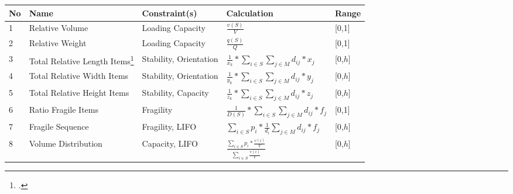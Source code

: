 \begin{table}[ht!]
    \centering
    \renewcommand{\arraystretch}{2.0}
    \begin{tabular}{@{}P{0.08\textwidth}P{0.16\textwidth}P{0.26\textwidth}P{0.28\textwidth}@{}P{0.1\textwidth}@{}}
        \toprule
        No & Name                                                                                            & Constraint(s)          & Calculation                                                               & Range   \\
          & Relative Volume                                                                                 & Loading Capacity       & $\displaystyle\frac{v(S)}{V}$                                             & [0,1]   \\
        2  & Relative Weight                                                                                 & Loading Capacity       & $\displaystyle\frac{q(S)}{Q}$                                             & [0,1]   \\
        3  & Total Relative Length Items\footcite[Feature is adapted from][p.21]{sarah_de_wolf_machine_2022} & Stability, Orientation & $\displaystyle\frac{1}{x_k} * \sum_{i \in S}\sum_{j \in M} d_{ij} * x_j$  & [0,$h$] \\
        4  & Total Relative Width Items \footnotemark[\value{footnote}]                                      & Stability, Orientation & $\displaystyle\frac{1}{y_k} * \sum_{i \in S}\sum_{j \in M} d_{ij} * y_j$  & [0,$h$] \\
        5  & Total Relative Height Items  \footnotemark[\value{footnote}]                                    & Stability, Capacity    & $\displaystyle\frac{1}{z_k} * \sum_{i \in S}\sum_{j \in M} d_{ij} * z_j$  & [0,$h$] \\
        6  & Ratio Fragile Items                                                                             & Fragility              & $\displaystyle\frac{1}{D(S)} * \sum_{i \in S}\sum_{j \in M} d_{ij} * f_j$ & [0,1]   \\
        7  & Fragile Sequence                                                                                & Fragility, \gls{LIFO}  & $\displaystyle\sum_{i \in S}p_i * \frac{1}{d_i}\sum_{j\in M} d_{ij}*f_j $ & [0,$h$] \\
        8  & Volume Distribution                                                                             & Capacity, \gls{LIFO}   & $\frac{\sum_{i \in S}p_i * \frac{v(i)}{V}}{\sum_{i \in S}\frac{v(i)}{V}}$ & [0,$h$] \\

\end{tabular}
\end{table}
